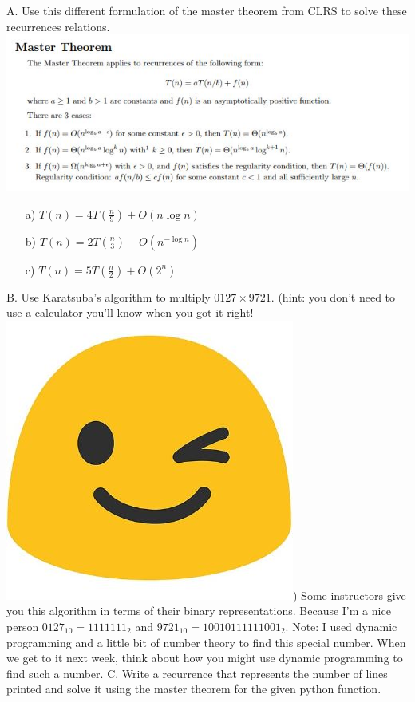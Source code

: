 \documentclass[12pt]{article}
\begin{document}
\noindent A. Use this different formulation of the master theorem from CLRS to solve these recurrences relations.
\\\includegraphics[width=\linewidth]{mastertheorem.JPG}
\begin{enumerate}
    \item[a)]$T(n) = 4T(\frac{n}{9}) + O(n \log{n})$
    \item[b)]$T(n) = 2T(\frac{n}{3}) + O(n^{-\log{n}})$
    \item[c)]$T(n) = 5T(\frac{n}{2}) + O(2^n)$
\end{enumerate}
\newpage
\noindent B. Use Karatsuba's algorithm to multiply $0127\times9721$. (hint: you don't need to use a calculator you'll know when you got it right! \includegraphics[scale = 0.05]{wink.jpg})
Some instructors give you this algorithm in terms of their binary representations. Because I'm a nice person
$0127_{10}=1111111_2$ and $9721_{10}=10010111111001_2$. Note: I used dynamic programming and a little bit of number
theory to find this special number. When we get to it next week, think about how you might use dynamic programming to
find such a number.
\newpage
\noindent C. Write a recurrence that represents the number of lines printed and solve it using the master theorem for the given python function.\\
\end{document}
